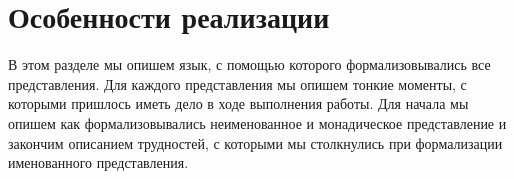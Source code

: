 \section{Особенности реализации}
\label{sec:impl}

В этом разделе мы опишем язык, с помощью которого формализовывались все представления. Для каждого представления мы опишем тонкие моменты, с которыми пришлось иметь дело в ходе выполнения работы. Для начала мы опишем как формализовывались неименованное и монадическое представление и закончим описанием трудностей, с которыми мы столкнулись при формализации именованного представления.






